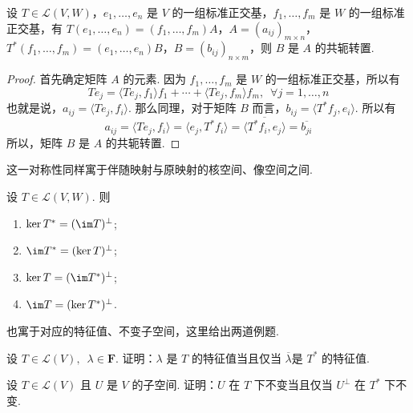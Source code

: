 \begin{theorem}
    设 $ T \in \mathcal{L}(V, W) $，$ e_1, \ldots , e_n $ 是 $ V $ 的一组标准正交基，$ f_1, \ldots , f_m $ 是 $ W $ 的一组标准正交基，有 $ T(e_1, \ldots , e_n) = (f_1, \ldots , f_m)A $，$ A = (a_{ij})_{m \times n} $，$ T^*(f_1, \ldots , f_m) =(e_1, \ldots , e_n)B $，$ B = (b_{ij})_{n \times m} $，则 $ B $ 是 $ A $ 的共轭转置.
\end{theorem}

\begin{proof}
    首先确定矩阵 $ A $ 的元素. 因为 $ f_1, \ldots , f_m $ 是 $ W $ 的一组标准正交基，所以有
    \[ Te_j = \langle Te_j, f_1 \rangle f_1 + \cdots + \langle Te_j, f_m \rangle f_m,\enspace \forall j = 1, \ldots , n \]
    也就是说，$ a_{ij} = \langle Te_j, f_i \rangle $. 那么同理，对于矩阵 $ B $ 而言，$ b_{ij} = \langle T^*f_j, e_i \rangle $. 所以有
    \[ a_{ij} = \langle Te_j, f_i \rangle = \langle e_j, T^*f_i \rangle = \overline{\langle T^*f_i, e_j \rangle} = \overline{b_{ji}} \]
    所以，矩阵 $ B $ 是 $ A $ 的共轭转置.
\end{proof}

这一对称性同样寓于伴随映射与原映射的核空间、像空间之间.

设 $ T \in \mathcal{L}(V, W) $. 则

\begin{enumerate}
    \item $ \ker T^* = (\im T)^{\perp} $;

    \item $ \im T^* = (\ker T)^{\perp} $;

    \item $ \ker T = (\im T^*)^{\perp} $;

    \item $ \im T = (\ker T^*)^{\perp} $.
\end{enumerate}

也寓于对应的特征值、不变子空间，这里给出两道例题.

\begin{example} \label{ex:24:伴随与特征值}
    设 $ T \in \mathcal{L}(V),\enspace \lambda \in \mathbf{F} $. 证明：$ \lambda $ 是 $ T $ 的特征值当且仅当 $ \overline{\lambda} $是 $ T^* $ 的特征值.
\end{example}

\begin{example} \label{ex:24:伴随与不变子空间}
    设 $ T \in \mathcal{L}(V) $ 且 $ U $ 是 $ V $ 的子空间. 证明：$ U $ 在 $ T $ 下不变当且仅当 $ U^{\perp} $ 在 $ T^* $ 下不变.
\end{example}

